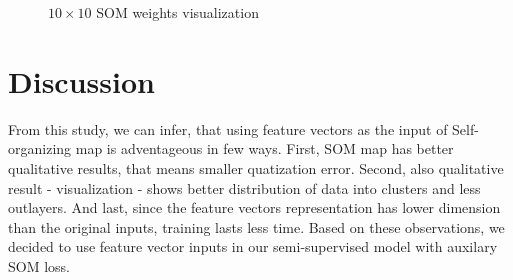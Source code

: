 \begin{figure}[h!]
    \centering
    
    \caption{$10 \times 10$ SOM weights visualization}
    \label{fig:som-weights}
\end{figure}


\section{Discussion}
From this study, we can infer, that using feature vectors as the input of Self-organizing map is adventageous in few ways. First, SOM map has better qualitative results, that means smaller quatization error. Second, also qualitative result - visualization - shows better distribution of data into clusters and less outlayers. And last, since the feature vectors representation has lower dimension than the original inputs, training lasts less time. Based on these observations, we decided to use feature vector inputs in our semi-supervised model with auxilary SOM loss.

